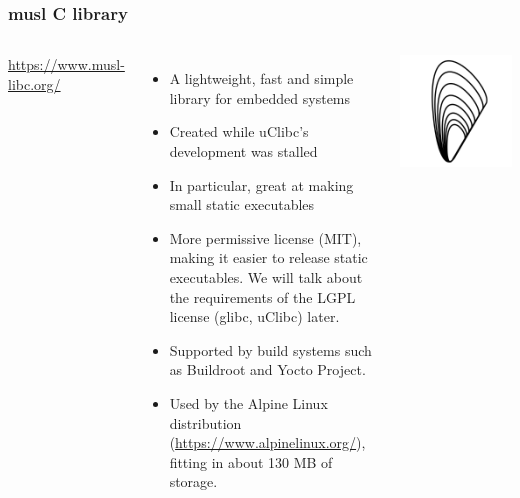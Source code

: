 \begin{frame}
  \frametitle{musl C library}
  \begin{columns}
      \url{https://www.musl-libc.org/}
      \begin{itemize}
      \item A lightweight, fast and simple library for embedded systems
      \item Created while uClibc's development was stalled
      \item In particular, great at making small static executables
      \item More permissive license (MIT), making it easier to release
            static executables. We will talk about the requirements
            of the LGPL license (glibc, uClibc) later.
      \item Supported by build systems such as Buildroot and Yocto
        Project.
      \item Used by the Alpine Linux distribution
        (\url{https://www.alpinelinux.org/}), fitting in about 130 MB of storage.
      \end{itemize}
    \includegraphics[width=\textwidth]{slides/c-libraries/musl.png}
  \end{columns}
\end{frame}

